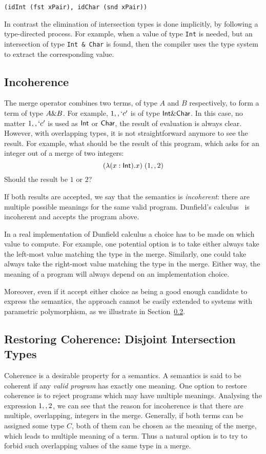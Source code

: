 \begin{lstlisting}
(idInt (fst xPair), idChar (snd xPair))
\end{lstlisting}

\noindent In contrast the elimination of intersection types is done
implicitly, by following a type-directed process. For example, 
when a value of type \lstinline{Int} is needed, but an intersection
of type \lstinline{Int & Char} is found, then the compiler uses the
type system to extract the corresponding value. 

\subsection{Incoherence}
The merge operator combines two terms, of type $A$ and $B$
respectively, to form a term of type $A \& B$. For example,
$1 ,, `c'$ is of type $\textsf{Int} \& \textsf{Char}$. In this case, no
matter $1 ,, `c'$ is used as $\textsf{Int}$ or $\textsf{Char}$, the result
of evaluation is always clear. However, with overlapping types, it is
not straightforward anymore to see the result. For example, what
should be the result of this program, which asks for an integer out of
a merge of two integers:
\[ (\lambda (x : \textsf{Int}). x) \; (1 ,, 2) \]
Should the result be $1$ or $2$?

If both results are accepted, we say that the semantics is
\emph{incoherent}: there are multiple possible meanings for the same
valid program. Dunfield's calculus~\cite{} is incoherent and accepts the
program above. 

In a real implementation of Dunfield calculus a choice has to be made
on which value to compute. For example, one potential option is to
take either always take the left-most value matching the type in the
merge. Similarly, one could take always take the right-most
value matching the type in the merge. Either way, the meaning
of a program will always depend on an implementation choice.

Moreover, even if it accept either choice as being a good enough
candidate to express the semantics, the approach cannot be easily
extended to systems with parametric polymorphism, as we illustrate 
in Section~\ref{}.

\subsection{Restoring Coherence: Disjoint Intersection Types}
Coherence is a desirable property for a semantics. A semantics is said
to be coherent if any \emph{valid program} has exactly one meaning.
One option to restore coherence is to reject programs which may have
multiple meanings. 
Analysing the expression $1 ,, 2$, we can see that the reason 
for incoherence is that there are multiple, overlapping, integers in the
merge. Generally, if both terms can be assigned some type $C$,
both of them can be chosen as the meaning of the merge,
which leads to multiple meaning of a term.
Thus a natural option is to try to forbid such overlapping 
values of the same type in a merge. 

